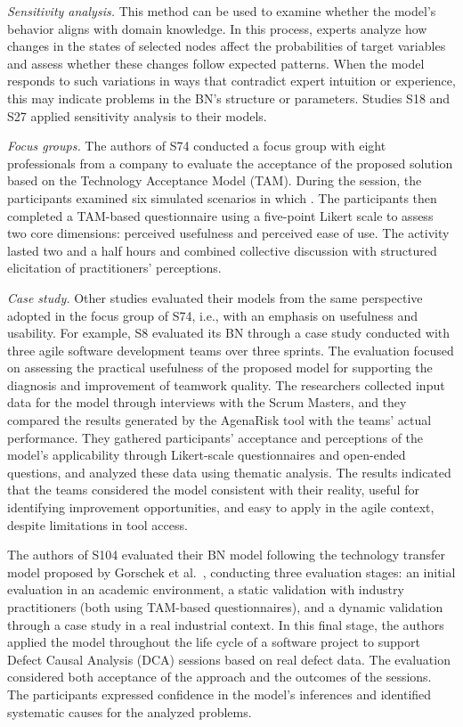 \textit{Sensitivity analysis.} This method can be used to examine whether the model's behavior aligns with domain knowledge. In this process, experts analyze how changes in the states of selected nodes affect the probabilities of target variables and assess whether these changes follow expected patterns. When the model responds to such variations in ways that contradict expert intuition or experience, this may indicate problems in the BN's structure or parameters. Studies S18 and S27 applied sensitivity analysis to their models.

\textit{Focus groups.} The authors of S74 conducted a focus group with eight professionals from a company to evaluate the acceptance of the proposed solution based on the Technology Acceptance Model (TAM). During the session, the participants examined six simulated scenarios in which . The participants then completed a TAM-based questionnaire using a five-point Likert scale to assess two core dimensions: perceived usefulness and perceived ease of use. The activity lasted two and a half hours and combined collective discussion with structured elicitation of practitioners' perceptions.

\textit{Case study.} Other studies evaluated their models from the same perspective adopted in the focus group of S74, i.e., with an emphasis on usefulness and usability. For example, S8 evaluated its BN through a case study conducted with three agile software development teams over three sprints. The evaluation focused on assessing the practical usefulness of the proposed model for supporting the diagnosis and improvement of teamwork quality. The researchers collected input data for the model through interviews with the Scrum Masters, and they compared the results generated by the AgenaRisk tool with the teams' actual performance. They gathered participants' acceptance and perceptions of the model's applicability through Likert-scale questionnaires and open-ended questions, and analyzed these data using thematic analysis. The results indicated that the teams considered the model consistent with their reality, useful for identifying improvement opportunities, and easy to apply in the agile context, despite limitations in tool access.

The authors of S104 evaluated their BN model following the technology transfer model proposed by Gorschek et al.~\cite{gorschek2006model}, conducting three evaluation stages: an initial evaluation in an academic environment, a static validation with industry practitioners (both using TAM-based questionnaires), and a dynamic validation through a case study in a real industrial context. In this final stage, the authors applied the model throughout the life cycle of a software project to support Defect Causal Analysis (DCA) sessions based on real defect data. The evaluation considered both acceptance of the approach and the outcomes of the sessions. The participants expressed confidence in the model's inferences and identified systematic causes for the analyzed problems. 

